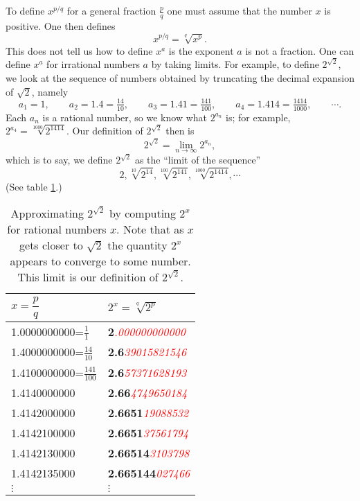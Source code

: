 To define $x^{p/q}$ for a general fraction $\frac p q$ one must assume
that the number $x$ is positive. One then defines
\begin{equation}\label{eq:pqpowerofx-def}
  x^{p/q}= \sqrt[q]{x^p}.
\end{equation}
This does not tell us how to define $x^a$ is the exponent $a$ is not a fraction.
One can define $x^a$ for irrational numbers $a$ by taking limits.  For example,
to define $2^{\sqrt{2}}$, we look at the sequence of numbers obtained by truncating
the decimal expansion of $\sqrt{2}$, namely
\[
a_1 = 1,
\qquad   a_2= 1.4=\tfrac{14}{10},
\qquad    a_3=1.41=\tfrac{141}{100},
\qquad a_4= 1.414=\tfrac{1414}{1000},
\qquad   \cdots.
\]
Each $a_n$ is a rational number, so we know what $2^{a_n}$ is; for example,
$2^{a_4} = \sqrt[1000]{2^{1414}}$.  Our definition of $2^{\sqrt{2}}$ then is
\[
2^{\sqrt{ 2}} = \lim_{n\to\infty} 2^{a_n},
\]
which is to say, we define $2^{\sqrt{2}}$ as the ``limit of the sequence''
\[
2, \sqrt[10]{2^{14}}, \sqrt[100]{2^{141}}, \sqrt[1000]{2^{1414}}, \cdots
\]
(See table \ref{tbl:07twototheroottwo}.)




\begin{table}[htdp]
  \begin{center}
    \begin{tabular}{ll}
      \toprule
      $x=\dfrac pq$  &  $\displaystyle 2^x = \sqrt[q]{2^p}$\\
      \midrule
      1.0000000000=$\frac11$ &
      \textbf{2}\textit{\textcolor{red}{.000000000000}}  \\[2pt]
      1.4000000000=$\frac{14}{10}$ &
      \textbf{2.6}\textit{\textcolor{red}{39015821546}}  \\[2pt]
      1.4100000000=$\frac{141}{100}$  &
      \textbf{2.6}\textit{\textcolor{red}{57371628193}}  \\[2pt]
      1.4140000000 &  \textbf{2.66}\textit{\textcolor{red}{4749650184}}  \\
      1.4142000000 &  \textbf{2.6651}\textit{\textcolor{red}{19088532}}  \\
      1.4142100000 &  \textbf{2.6651}\textit{\textcolor{red}{37561794}}  \\
      1.4142130000 &  \textbf{2.66514}\textit{\textcolor{red}{3103798}}  \\
      1.4142135000 &  \textbf{2.665144}\textit{\textcolor{red}{027466}}  \\
      $\vdots$  &\hspace{24pt} $\vdots$\\
      \bottomrule
    \end{tabular}
  \end{center}\smallskip
  \caption{Approximating $2^{\sqrt{2}}$ by computing $2^x$ for rational
numbers $x$.  Note that as $x$ gets closer to $\sqrt2$ the quantity
$2^x$ appears to converge to some number.  This limit is our
definition of $2^{\sqrt{2}}$.}
  \label{tbl:07twototheroottwo}
\end{table}%








